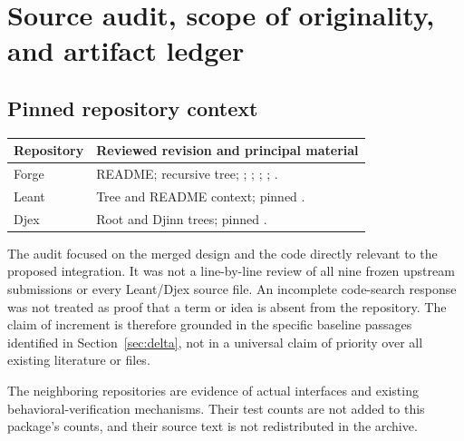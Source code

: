 \section{Source audit, scope of originality, and artifact ledger}

\subsection{Pinned repository context}
\begin{longtable}{@{}P{0.18\textwidth}P{0.74\textwidth}@{}}
\toprule
Repository & Reviewed revision and principal material \\
\midrule
\endhead
Forge & \newline
README; recursive tree; ;
; ;
; . \\
Leant & \newline
Tree and README context; pinned . \\
Djex & \newline
Root and Djinn trees; pinned
. \\
\bottomrule
\end{longtable}

The audit focused on the merged design and the code directly relevant to the
proposed integration. It was not a line-by-line review of all nine frozen
upstream submissions or every Leant/Djex source file. An incomplete code-search
response was not treated as proof that a term or idea is absent from the
repository. The claim of increment is therefore grounded in the specific
baseline passages identified in Section~\ref{sec:delta}, not in a universal
claim of priority over all existing literature or files.

The neighboring repositories are evidence of actual interfaces and existing
behavioral-verification mechanisms. Their test counts are not added to this
package's counts, and their source text is not redistributed in the archive.


